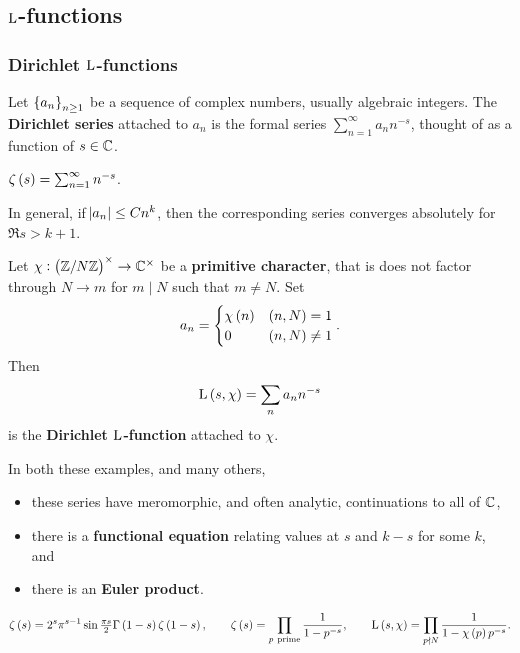 \pagebreak

\subsection{\texorpdfstring{$ \mathrm{L} $}{L}-functions}

\subsubsection{Dirichlet \texorpdfstring{$ \mathrm{L} $}{L}-functions}

\begin{definition}
Let $ \cbr{a_n}_{n \ge 1} $ be a sequence of complex numbers, usually algebraic integers. The \textbf{Dirichlet series} attached to $ a_n $ is the formal series $ \sum_{n = 1}^\infty a_nn^{-s} $, thought of as a function of $ s \in \mathbb{C} $.
\end{definition}

\begin{example*}
$ \zeta\br{s} = \sum_{n = 1}^\infty n^{-s} $.
\end{example*}

In general, if $ \abs{a_n} \le Cn^k $, then the corresponding series converges absolutely for $ \Re s > k + 1 $.

\begin{example*}
Let $ \chi : \unit{N} \to \CC^\times $ be a \textbf{primitive character}, that is does not factor through $ \unit{N} \to \unit{m} $ for $ m \mid N $ such that $ m \ne N $. Set
$$ a_n =
\begin{cases}
\chi\br{n} & \br{n, N} = 1 \\
0 & \br{n, N} \ne 1
\end{cases}.
$$
Then
$$ \L\br{s, \chi} = \sum_n a_nn^{-s} $$
is the \textbf{Dirichlet $ \mathrm{L} $-function} attached to $ \chi $.
\end{example*}

In both these examples, and many others,
\begin{itemize}
\item these series have meromorphic, and often analytic, continuations to all of $ \mathbb{C} $,
\item there is a \textbf{functional equation} relating values at $ s $ and $ k - s $ for some $ k $, and
\item there is an \textbf{Euler product}.
\end{itemize}

\begin{example*}
$$ \zeta\br{s} = 2^s\pi^{s - 1}\sin \tfrac{\pi s}{2}\Gamma\br{1 - s}\zeta\br{1 - s}, \qquad \zeta\br{s} = \prod_{p \ \text{prime}} \dfrac{1}{1 - p^{-s}}, \qquad \L\br{s, \chi} = \prod_{p \nmid N} \dfrac{1}{1 - \chi\br{p}p^{-s}}. $$
\end{example*}

